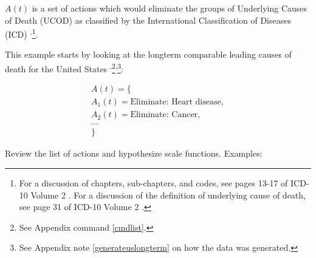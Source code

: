 \documentclass[10pt, a4paper, twocolumn]{IEEEconf}
\begin{document}
$A(t)$ is a set of actions which would eliminate the groups of Underlying Causes of Death (UCOD) as classified by the International Classification of Diseases (ICD) \citep{icd10vol1,icd10vol2,icd10vol3}\textsuperscript{,}\footnote{For a discussion of chapters, sub-chapters, and codes, see pages 13-17 of ICD-10 Volume 2 \citep{icd10vol2}.
For a discussion of the definition of underlying cause of death, see page 31 of ICD-10 Volume 2 \citep{icd10vol2}.}.

This example starts by looking at the longterm comparable leading causes of death for the United States \citep{uslcod19001998,nbermortality,centers2017underlying,uspopulation19002001,censusestimates19001999}\textsuperscript{,}\footnote{See Appendix command \ref{cmdlist}.}\textsuperscript{,}\footnote{See Appendix note \ref{generateuslongterm} on how the data was generated.}:

\begin{equation*}
  \begin{gathered}
    A(t) = \{\\
    A_1(t) = \textrm{Eliminate: Heart disease},\\
    A_2(t) = \textrm{Eliminate: Cancer},\\
    \textrm{\ldots}\\
    \}
  \end{gathered}
\end{equation*}

Review the list of actions and hypothesize scale functions. Examples:
\end{document}
